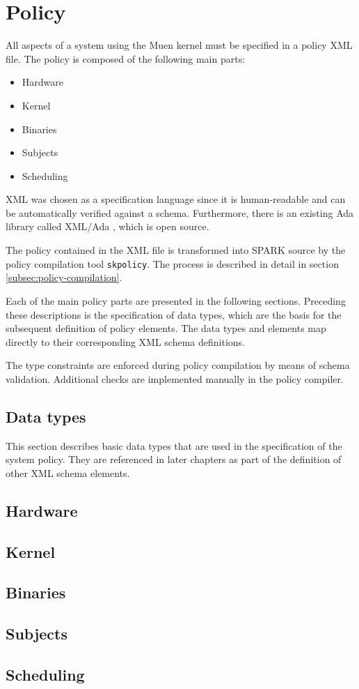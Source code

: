 \section{Policy}\label{sec:policy}
All aspects of a system using the Muen kernel must be specified in a policy XML
file. The policy is composed of the following main parts:

\begin{itemize}
	\item Hardware
	\item Kernel
	\item Binaries
	\item Subjects
	\item Scheduling
\end{itemize}

XML was chosen as a specification language since it is human-readable and can
be automatically verified against a schema. Furthermore, there is an existing
Ada library called XML/Ada \cite{xmlada}, which is open source.

The policy contained in the XML file is transformed into SPARK source by the
policy compilation tool \texttt{skpolicy}. The process is described in detail in
section \ref{subsec:policy-compilation}.

Each of the main policy parts are presented in the following sections. Preceding
these descriptions is the specification of data types, which are the basis for
the subsequent definition of policy elements. The data types and elements map
directly to their corresponding XML schema definitions.

The type constraints are enforced during policy compilation by means of schema
validation. Additional checks are implemented manually in the policy compiler.

\subsection{Data types}
This section describes basic data types that are used in the specification of
the system policy. They are referenced in later chapters as part of the
definition of other XML schema elements.



\subsection{Hardware}
\label{subsec:hardware}


\subsection{Kernel}


\subsection{Binaries}


\clearpage
\subsection{Subjects}\label{subsec:subjects}


\subsection{Scheduling}

